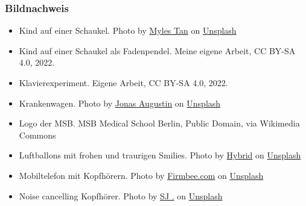 \documentclass{beamer}
\begin{document}
\begin{frame}
\frametitle{Bildnachweis}

\begin{tiny}

\begin{itemize}


\item
Kind auf einer Schaukel. Photo by \href{https://unsplash.com/@mylestan?utm_source=unsplash&utm_medium=referral&utm_content=creditCopyText}{Myles Tan} on \href{https://unsplash.com/s/photos/swing?utm_source=unsplash&utm_medium=referral&utm_content=creditCopyText }{Unsplash}
  
\item
Kind auf einer Schaukel als Fadenpendel. Meine eigene Arbeit, CC BY-SA 4.0, 2022. 

\item
Klavierexperiment. Eigene Arbeit, CC BY-SA 4.0, 2022.

\item
Krankenwagen. Photo by \href{https://unsplash.com/@augustinfoto?utm_source=unsplash&utm_medium=referral&utm_content=creditCopyText}{Jonas Augustin} on \href{https://unsplash.com/s/photos/krankenwagen?utm_source=unsplash&utm_medium=referral&utm_content=creditCopyText}{Unsplash}
  

\item
Logo der MSB. MSB Medical School Berlin, Public Domain, via Wikimedia Commons


\item
Luftballons mit frohen und traurigen Smilies. Photo by \href{https://unsplash.com/@artbyhybrid?utm_source=unsplash&utm_medium=referral&utm_content=creditCopyText}{Hybrid} on \href{https://unsplash.com/s/photos/feedback?utm_source=unsplash&utm_medium=referral&utm_content=creditCopyText}{Unsplash}

\item
Mobiltelefon mit Kopfhörern. Photo by \href{https://unsplash.com/@firmbee?utm_source=unsplash&utm_medium=referral&utm_content=creditCopyText}{Firmbee.com} on \href{https://unsplash.com/s/photos/mp3?utm_source=unsplash&utm_medium=referral&utm_content=creditCopyText}{Unsplash}
  

\item
Noise cancelling Kopfhörer. Photo by \href{https://unsplash.com/@sjcbrn?utm_source=unsplash&utm_medium=referral&utm_content=creditCopyText}{SJ .} on \href{https://unsplash.com/s/photos/noise-cancelling-headphones?utm_source=unsplash&utm_medium=referral&utm_content=creditCopyText}{Unsplash}  


\end{itemize}
\end{tiny}
\end{frame}
\end{document}

